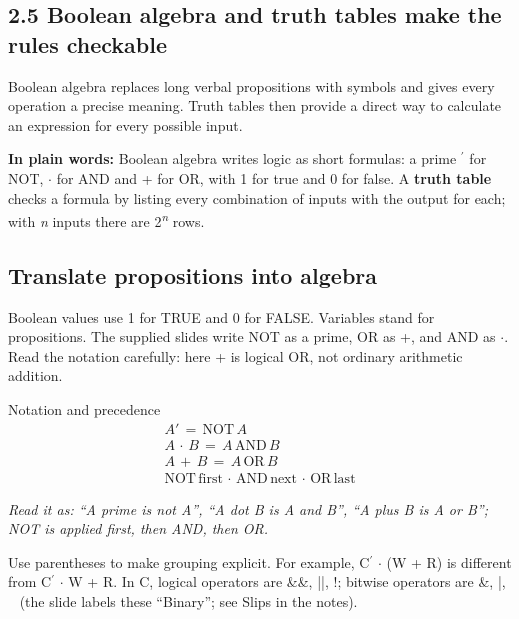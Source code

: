 \documentclass[11pt]{article}
\begin{document}
\begin{keepsection}
\section{2.5 Boolean algebra and truth tables make the rules checkable}

Boolean algebra replaces long verbal propositions with symbols and gives every operation a precise meaning. Truth tables then provide a direct way to calculate an expression for every possible input.

\begin{plainbox}\textbf{In plain words:} Boolean algebra writes logic as short formulas: a prime \ensuremath{{}^{\prime}} for NOT, \ensuremath{\cdot} for AND and + for OR, with 1 for true and 0 for false. A \textbf{truth table} checks a formula by listing every combination of inputs with the output for each; with \textit{n} inputs there are 2\textsuperscript{\textit{n}} rows.\end{plainbox}

\begin{keepsection}
\subsection{Translate propositions into algebra}

Boolean values use 1 for TRUE and 0 for FALSE. Variables stand for propositions. The supplied slides write NOT as a prime, OR as +, and AND as \ensuremath{\cdot}. Read the notation carefully: here + is logical OR, not ordinary arithmetic addition.

\begin{equationcard}{Notation and precedence}
\[ \begin{gathered} {A}'\, =\, \text{NOT}\, {A} \\ {A}\, \cdot \, {B}\, =\, {A}\, \text{AND}\, {B} \\ {A}\, +\, {B}\, =\, {A}\, \text{OR}\, {B} \\ \text{NOT}\, \text{first}\, \cdot \, \text{AND}\, \text{next}\, \cdot \, \text{OR}\, \text{last} \end{gathered} \]
{\small \emph{Read it as: “A prime is not A”, “A dot B is A and B”, “A plus B is A or B”; NOT is applied first, then AND, then OR.}\par Use parentheses to make grouping explicit. For example, C\ensuremath{{}^{\prime}} \ensuremath{\cdot} (W + R) is different from C\ensuremath{{}^{\prime}} \ensuremath{\cdot} W + R. In C, logical operators are \&\&, ||, !; bitwise operators are \&, |, ~ (the slide labels these “Binary”; see Slips in the notes).}
\end{equationcard}
\end{keepsection}


\end{keepsection}
\end{document}
